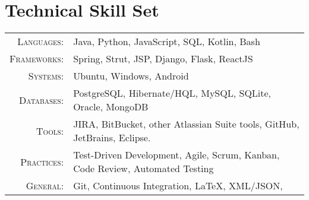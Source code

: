\section{Technical Skill Set}

\begin{tabular}{r|p{11cm}}
	\textsc{Languages}: & Java, Python, JavaScript, SQL, Kotlin, Bash \\
	\textsc{Frameworks}: & Spring, Strut, JSP, Django, Flask, ReactJS \\
	\textsc{Systems}: & Ubuntu, Windows, Android \\
	\textsc{Databases}: & PostgreSQL, Hibernate/HQL, MySQL, SQLite, Oracle, MongoDB \\
	\textsc{Tools}: & JIRA, BitBucket, other Atlassian Suite tools, GitHub, JetBrains, Eclipse. \\
	\textsc{Practices}: & Test-Driven Development, Agile, Scrum, Kanban, Code Review, Automated Testing \\
	\textsc{General}: & Git, Continuous Integration, LaTeX, XML/JSON,  \\
\end{tabular}
